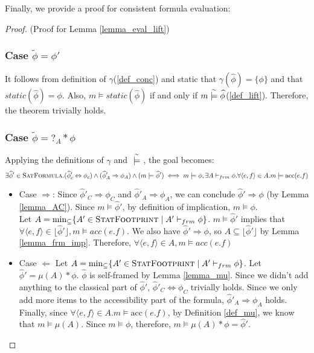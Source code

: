 \documentclass {article}
\newcommand{\fphi}{\widehat{\phi}}
\newcommand{\tphi}{\widetilde{\phi}}
\newcommand{\acc}[1]{\text{acc}(#1)}
\newcommand{\consistent}{\models}
\newcommand{\tconsistent}{\hspace{1mm}\widetilde{\models}\hspace{1mm}}
\newcommand{\frm}{\vdash_{frm}}
\newcommand{\satdef}{\textsc{SatFormula}}
\newcommand{\statfprint}{\textsc{StatFootprint}}
\begin{document}
Finally, we provide a proof for consistent formula evaluation:
\begin{proof} (Proof for Lemma \ref{lemma_eval_lift})
\subsubsection*{Case $\tphi = \phi'$}
 It follows from definition of $\gamma$(\ref{def_conc}) and static that $\gamma(\fphi) = \{\phi\}$ and that $static(\fphi) = \phi$. Also, $m \consistent static(\fphi)$ if and only if $m \tconsistent \fphi$(\ref{def_lift}). Therefore, the theorem trivially holds.
 


 \subsubsection*{Case $\tphi = ?_A \ast \phi$}
 Applying the definitions of $\gamma$ and $\tconsistent$, the goal becomes: $$\exists \fphi' \in 
\satdef. (\fphi'_c \Leftrightarrow \phi_c) \wedge (\fphi'_A \Rightarrow \phi_A) \wedge (m \consistent  \fphi') \iff m \consistent \phi, \exists A \frm \phi.\forall \langle e,f\rangle  \in A. m \consistent \acc{e.f}$$
 \begin{itemize}
     \item Case $\Rightarrow$: Since $\fphi'_C \Rightarrow \phi_C$ and $\fphi'_A \Rightarrow \phi_A$, we can conclude $\fphi' \Rightarrow \phi$ (by Lemma \ref{lemma_AC}). Since $m \consistent \fphi'$, by definition of implication, $m \consistent \phi$.\\ 
Let $A = \min_{\subseteq}\{A' \in \statfprint \mid A' \frm \phi\}$. $m \consistent \fphi'$ implies that $\forall \langle e,f\rangle  \in \lfloor \fphi' \rfloor, m \consistent acc(e.f)$. We also have $\fphi' \Rightarrow \phi$, so $A \subseteq \lfloor \fphi' \rfloor$ by Lemma \ref{lemma_frm_imp}. Therefore, $\forall \langle e,f\rangle  \in A, m \consistent acc(e.f)$
     \item Case $\Leftarrow$ Let $A = \min_{\subseteq}\{A' \in \statfprint \mid A' \frm \phi\}$. Let $\fphi' = \mu(A) \ast \phi$. $\fphi$ is self-framed by Lemma \ref{lemma_mu}. Since we didn't add anything to the classical part of $\fphi'$, $\fphi'_C \Leftrightarrow \phi_C$ trivially holds. Since we only add more items to the accessibility part of the formula, $\fphi'_A \Rightarrow \phi_A$ holds. Finally, since $\forall \langle e,f\rangle  \in A. m \consistent \acc{e.f}$, by Definition \ref{def_mu}, we know that $m \consistent \mu(A)$. Since $m \consistent \phi$, therefore, $m \consistent \mu(A) * \phi = \fphi'$.\\
 \end{itemize}
 

\end{proof}
\end{document}
